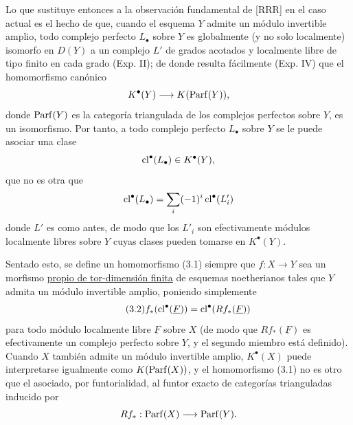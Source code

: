 Lo que sustituye entonces a la observación fundamental de [RRR] en el caso
actual es el hecho de que, cuando el esquema $Y$ admite un módulo invertible
amplio, todo complejo perfecto $L_\bullet$ sobre $Y$ es globalmente (y no
solo localmente) isomorfo en $D(Y)$ a un complejo $L'$ de grados acotados y
localmente libre de tipo finito en cada grado (Exp. II); de donde resulta
fácilmente (Exp. IV) que el homomorfismo canónico
\[
K^\bullet(\sisi{X}{Y})\longrightarrow K(\Parf(Y)), %
\]
donde $\operatorname{Parf}(Y)$ es la categoría triangulada de los complejos perfectos sobre
$Y$, es un isomorfismo. Por tanto, a todo complejo perfecto $L_\bullet$
sobre $Y$ se le puede asociar una clase
\[
\operatorname{cl}^\bullet(L_\bullet)\in K^\bullet(Y),
\]
que no es otra que
\[
\sisi{\cl}{\cl^\bullet}(L_\bullet)=\sum_i(-1)^i\cl^\bullet(L'_i) %
\]
donde $L'$ es como antes, de modo que los $L'_i$ son efectivamente módulos
localmente libres sobre $Y$ cuyas clases pueden tomarse en $K^\bullet(Y)$.

Sentado esto, se define un homomorfismo (3.1) siempre que $f:X\to Y$ sea un
morfismo \underline{propio de tor-dimensión finita} de esquemas noetherianos
tales que $Y$ admita un módulo invertible amplio, poniendo simplemente
\begin{equation}\tag{3.2}
f_*(\operatorname{cl}^\bullet(\underline F))=\operatorname{cl}^\bullet(Rf_*(\underline F))
\end{equation}
para todo módulo localmente libre $\underline F$ sobre $X$ (de modo que
$Rf_*(\underline F)$ es efectivamente un complejo perfecto sobre $Y$, y el
segundo miembro está definido). Cuando $X$ también admite un módulo
invertible amplio, $K^\bullet(X)$ puede interpretarse igualmente como
$K(\operatorname{Parf}(X))$, y el homomorfismo (3.1) no es otro que el asociado, por
funtorialidad, al funtor exacto de categorías trianguladas inducido por
\[
Rf_*:\operatorname{Parf}(X)\longrightarrow \operatorname{Parf}(Y).
\]

